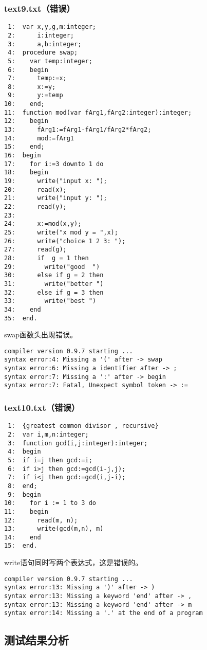 \subsubsection{text9.txt（错误）}
\begin{verbatim}
 1:  var x,y,g,m:integer;
 2:      i:integer;
 3:      a,b:integer;
 4:  procedure swap;
 5:    var temp:integer;
 6:    begin
 7:      temp:=x;
 8:      x:=y;
 9:      y:=temp
10:    end;
11:  function mod(var fArg1,fArg2:integer):integer;
12:    begin
13:      fArg1:=fArg1-fArg1/fArg2*fArg2;
14:      mod:=fArg1
15:    end;
16:  begin
17:    for i:=3 downto 1 do
18:    begin
19:      write("input x: ");
20:      read(x);
21:      write("input y: ");
22:      read(y);  
23:    
24:      x:=mod(x,y);
25:      write("x mod y = ",x);
26:      write("choice 1 2 3: ");
27:      read(g);
28:      if  g = 1 then
29:        write("good  ")
30:      else if g = 2 then
31:        write("better ")
32:      else if g = 3 then
33:        write("best ")
34:    end
35:  end.
\end{verbatim}
swap函数头出现错误。
\begin{verbatim}
compiler version 0.9.7 starting ...
syntax error:4: Missing a '(' after -> swap
syntax error:6: Missing a identifier after -> ;
syntax error:7: Missing a ':' after -> begin
syntax error:7: Fatal, Unexpect symbol token -> :=
\end{verbatim}

\subsubsection{text10.txt（错误）}
\begin{verbatim}
 1:  {greatest common divisor , recursive}
 2:  var i,m,n:integer;
 3:  function gcd(i,j:integer):integer;
 4:  begin
 5:  if i=j then gcd:=i;
 6:  if i>j then gcd:=gcd(i-j,j);
 7:  if i<j then gcd:=gcd(i,j-i);
 8:  end;
 9:  begin 
10:    for i := 1 to 3 do
11:    begin
12:      read(m, n);
13:      write(gcd(m,n), m)
14:    end
15:  end.
\end{verbatim}
write语句同时写两个表达式，这是错误的。
\begin{verbatim}
compiler version 0.9.7 starting ...
syntax error:13: Missing a ')' after -> )
syntax error:13: Missing a keyword 'end' after -> ,
syntax error:13: Missing a keyword 'end' after -> m
syntax error:14: Missing a '.' at the end of a program
\end{verbatim}

\subsection{测试结果分析}

